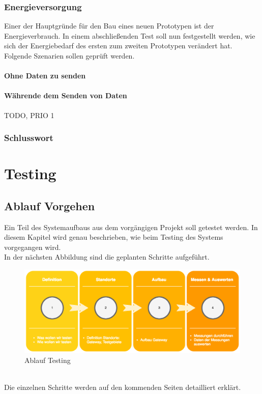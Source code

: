 \documentclass[11pt,english,german]{report}
\theoremstyle{definition}
\begin{document}
\subsection{Energieversorgung}
Einer der Hauptgründe für den Bau eines neuen Prototypen ist der Energieverbrauch. In einem abschließenden Test soll nun festgestellt werden, wie sich der Energiebedarf des ersten zum zweiten Prototypen verändert hat. Folgende Szenarien sollen geprüft werden.
\subsubsection{Ohne Daten zu senden}
\subsubsection{Währende dem Senden von Daten}

TODO, PRIO 1


\subsection{Schlusswort}



\chapter{Testing}
\section{Ablauf Vorgehen}
Ein Teil des Systemaufbaus aus dem vorgängigen Projekt soll getestet werden. In diesem Kapitel wird genau beschrieben, wie beim Testing des Systems vorgegangen wird.\\[0.3cm]
In der nächsten Abbildung sind die geplanten Schritte aufgeführt.
\begin{figure}[h]
	\centering
	\includegraphics[width=\textwidth]{img/projectFlow_testing.png}
	\caption[Flowchart Testing]
	{Ablauf Testing}
\end{figure}
\\ 
Die einzelnen Schritte werden auf den kommenden Seiten detailliert erklärt.
\newpage
\end{document}
